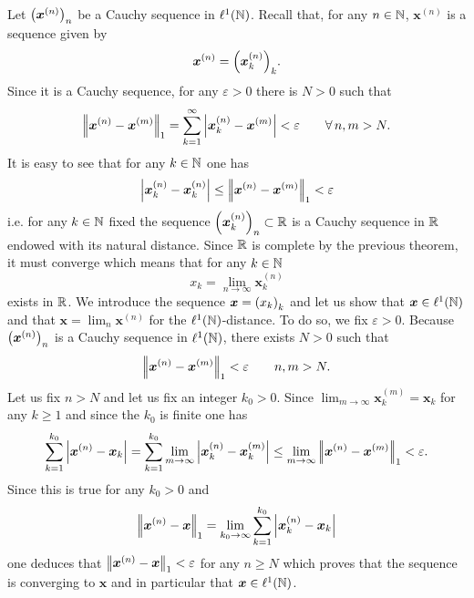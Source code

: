 \documentclass{article}
\begin{document}
\begin{fancyproof}
	Let ${\left(\bm{x}^{(n)}\right)}_{n}$ be a Cauchy sequence in $\ell^{1}(\mathbb{N})$. Recall that, for any $n\in\mathbb{N}$, $\bm{x}^{(n)}$ is a sequence given by
	\begin{equation*}
		\bm{x}^{(n)}={\left(\bm{x}^{(n)}_{k}\right)}_{k}.
	\end{equation*}
	Since it is a Cauchy sequence, for any $\varepsilon>0$ there is $N>0$ such that
	\begin{equation*}
		\left|\negthinspace\left|\bm{x}^{(n)}-\bm{x}^{(m)}\right|\negthinspace\right|_{1}=\sum_{k=1}^{\infty}\left|\bm{x}_{k}^{(n)}-\bm{x}^{(m)}\right|<\varepsilon\qquad\forall\, n,m>N.
	\end{equation*}
	It is easy to see that for any $k\in\mathbb{N}$ one has
	\begin{equation*}
		\left|\bm{x}_{k}^{(n)}-\bm{x}_{k}^{(n)}\right|\leq\left|\negthinspace\left|\bm{x}^{(n)}-\bm{x}^{(m)}\right|\negthinspace\right|_{1}<\varepsilon
	\end{equation*}
	i.e. for any $k\in\mathbb{N}$ fixed the sequence ${\left(\bm{x}^{(n)}_{k}\right)}_{n}\subset\mathbb{R}$ is a Cauchy sequence in $\mathbb{R}$ endowed with its natural distance. Since $\mathbb{R}$ is complete by the previous theorem, it must converge which means that for any $k\in\mathbb{N}$
	\begin{equation*}
		x_{k}=\lim_{n\to\infty}\bm{x}^{(n)}_{k}
	\end{equation*}
	exists in $\mathbb{R}$. We introduce the sequence $\bm{x}={\left({x}_{k}\right)}_{k}$ and let us show that $\bm{x}\in\ell^{1}(\mathbb{N})$ and that $\bm{x}=\lim_{n}\bm{x}^{(n)}$ for the $\ell^{1}(\mathbb{N})$-distance. To do so, we fix $\varepsilon>0$. Because ${\left(\bm{x}^{(n)}\right)}_{n}$ is a Cauchy sequence in $\ell^{1}(\mathbb{N})$, there exists $N>0$ such that
	\begin{equation*}
		\left|\negthinspace\left|\bm{x}^{(n)}-\bm{x}^{(m)}\right|\negthinspace\right|_{1}<\varepsilon\qquad n,m>N.
	\end{equation*}
	Let us fix $n>N$ and let us fix an integer $k_{0}>0$. Since $\lim_{m\to\infty}\bm{x}^(m)_{k}=\bm{x}_{k}$ for any $k\geq 1$ and since the $k_{0}$ is finite one has
	\begin{equation*}
		\sum_{k=1}^{k_{0}}\left|\bm{x}^{(n)}-\bm{x}_{k}\right|=\sum_{k=1}^{k_{0}}\lim_{m\to\infty}\left|\bm{x}^{(n)}_{k}-\bm{x}_{k}^{(m)}\right|\leq\lim_{m\to\infty}\left|\negthinspace\left|\bm{x}^{(n)}-\bm{x}^{(m)}\right|\negthinspace\right|_{1}<\varepsilon.
	\end{equation*}
	Since this is true for any $k_{0}>0$ and 
	\begin{equation*}
		\left|\negthinspace\left|\bm{x}^{(n)}-\bm{x}\right|\negthinspace\right|_{1}=\lim_{k_{0}\to\infty}\sum_{k=1}^{k_{0}}\left|\bm{x}^{(n)}_{k}-\bm{x}_{k}\right|
	\end{equation*}
	one deduces that $\left|\negthinspace\left|\bm{x}^{(n)}-\bm{x}\right|\negthinspace\right|_{1}<\varepsilon$ for any $n\geq N$ which proves that the sequence is converging to $\bm{x}$ and in particular that $\bm{x}\in\ell^{1}(\mathbb{N})$.
\end{fancyproof}
\end{document}

